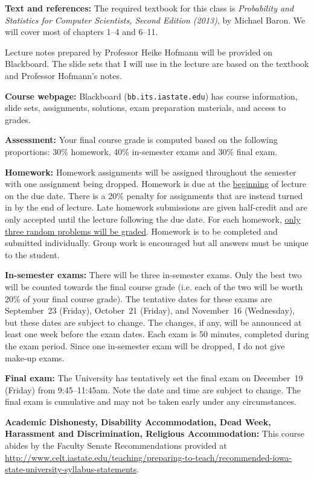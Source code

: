 \documentclass[10pt]{article}
\newcommand{\sep}{\vspace*{0.4cm}}
\newcommand{\tab}{\hspace*{0.8cm}}
\begin{document}
\textbf{Text and references:} 
The required textbook for this class is \textit{Probability and Statistics for
  Computer Scientists, Second Edition (2013)}, by Michael Baron. We will cover most of chapters 1--4 and 6--11. 

Lecture notes prepared by Professor Heike Hofmann will be provided on Blackboard.
The slide sets that I will use in the lecture are based on the textbook and
Professor Hofmann's notes.
\sep

\textbf{Course webpage:} Blackboard ({\tt bb.its.iastate.edu})
has course information, slide sets, assignments,
solutions, exam preparation materials, and access to grades.
\sep

\textbf{Assessment:} Your final course grade is computed based on the following proportions:
30\% homework, 40\% in-semester exams and 30\% final exam.
\sep

\newpage
\tab \textbf{Homework:}
Homework assignments will be assigned throughout the semester with one assignment being dropped.
Homework is due at the \underline{beginning} of lecture on the due date.
There is a 20\% penalty for assignments that are instead turned in by the end of lecture.
Late homework submissions are given half-credit and are only accepted until the lecture following the due date. 
For each homework, \underline{only three random problems will be graded}.
Homework is to be completed and submitted individually. Group work is encouraged but all answers must be unique to the student.
\sep

\tab \textbf{In-semester exams:}
There will be three in-semester exams. Only the best two will be counted towards the final course grade (i.e. each of the two will be worth 20\% of your final course grade).
The tentative dates for these exams are September~23 (Friday), October~21
(Friday), and November~16 (Wednesday), but these dates are subject to change. 
The changes, if any, will be announced at least one week before the exam dates.
Each exam is 50 minutes, completed during the exam period.
Since one in-semester exam will be dropped, I do not give make-up exams.
\sep

\tab \textbf{Final exam:}
The University has tentatively set the final exam on December~19 (Friday)
from 9:45--11:45am. Note the date and time are subject to change.
The final exam is cumulative and may not be taken early under any circumstances.
\sep

\tab \textbf{Academic Dishonesty, Disability Accommodation, Dead Week, Harassment and Discrimination, Religious Accommodation:} This course abides by the Faculty Senate Recommendations provided at \url{http://www.celt.iastate.edu/teaching/preparing-to-teach/recommended-iowa-state-university-syllabus-statements}.
\end{document}
